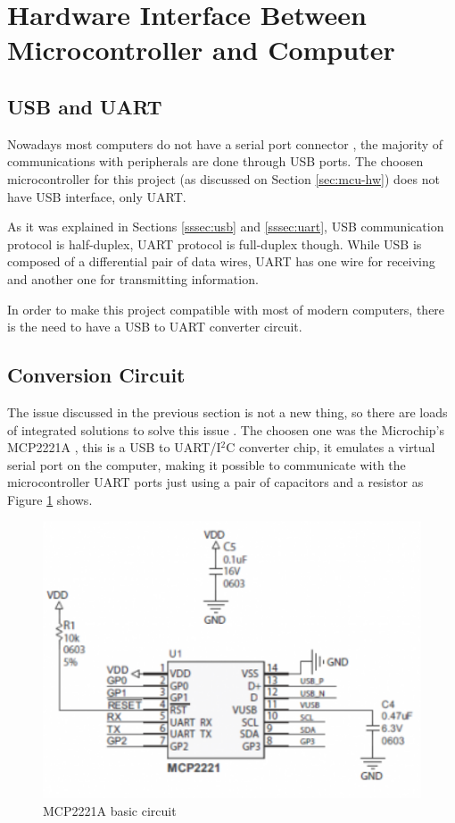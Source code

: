 \section{Hardware Interface Between Microcontroller and Computer}

	\subsection{USB and UART}
		Nowadays most computers do not have a serial port connector \cite{serialPortNeverSayDie}, the majority of communications with peripherals are done through USB ports. The choosen microcontroller for this project (as discussed on Section \ref{sec:mcu-hw}) does not have USB interface, only UART. 

		As it was explained in Sections \ref{sssec:usb} and \ref{sssec:uart}, USB communication protocol is half-duplex, UART protocol is full-duplex though. While USB is composed of a differential pair of data wires, UART has one wire for receiving and another one for transmitting information. 

		In order to make this project compatible with most of modern computers, there is the need to have a USB to UART converter circuit.

	\subsection{Conversion Circuit}

		The issue discussed in the previous section is not a new thing, so there are loads of integrated solutions to solve this issue \cite{usbSerialAdapter}. The choosen one was the Microchip's MCP2221A \cite{mcp2221a-datasheet}, this is a USB to UART/I$^2$C converter chip, it emulates a virtual serial port on the computer, making it possible to communicate with the microcontroller UART ports just using a pair of capacitors and a resistor as Figure \ref{fig:mcp2221a-basic-circuit} shows.

		\begin{figure}[htbp]
			\centering
				\includegraphics[scale=1]{figuras/fig-mcp2221a-basic-circuit}
			\caption{MCP2221A basic circuit \cite{mcp2221a-basic-circuit}}
			\label{fig:mcp2221a-basic-circuit}
		\end{figure}

